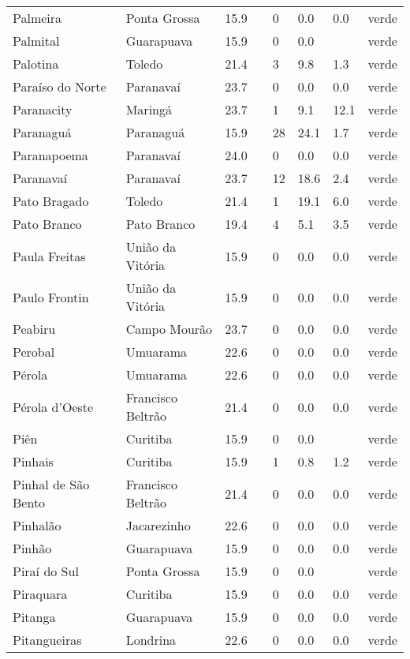 \begin{longtable}{l|lllllll}
  Palmeira & Ponta Grossa & 15.9 &  & 0 & 0.0 & 0.0 & verde \\ 
  Palmital & Guarapuava & 15.9 &  & 0 & 0.0 &  & verde \\ 
  Palotina & Toledo & 21.4 &  & 3 & 9.8 & 1.3 & verde \\ 
  Paraíso do Norte & Paranavaí & 23.7 &  & 0 & 0.0 & 0.0 & verde \\ 
  Paranacity & Maringá & 23.7 &  & 1 & 9.1 & 12.1 & verde \\ 
  Paranaguá & Paranaguá & 15.9 &  & 28 & 24.1 & 1.7 & verde \\ 
  Paranapoema & Paranavaí & 24.0 &  & 0 & 0.0 & 0.0 & verde \\ 
  Paranavaí & Paranavaí & 23.7 &  & 12 & 18.6 & 2.4 & verde \\ 
  Pato Bragado & Toledo & 21.4 &  & 1 & 19.1 & 6.0 & verde \\ 
  Pato Branco & Pato Branco & 19.4 &  & 4 & 5.1 & 3.5 & verde \\ 
  Paula Freitas & União da Vitória & 15.9 &  & 0 & 0.0 & 0.0 & verde \\ 
  Paulo Frontin & União da Vitória & 15.9 &  & 0 & 0.0 & 0.0 & verde \\ 
  Peabiru & Campo Mourão & 23.7 &  & 0 & 0.0 & 0.0 & verde \\ 
  Perobal & Umuarama & 22.6 &  & 0 & 0.0 & 0.0 & verde \\ 
  Pérola & Umuarama & 22.6 &  & 0 & 0.0 & 0.0 & verde \\ 
  Pérola d'Oeste & Francisco Beltrão & 21.4 &  & 0 & 0.0 & 0.0 & verde \\ 
  Piên & Curitiba & 15.9 &  & 0 & 0.0 &  & verde \\ 
  Pinhais & Curitiba & 15.9 &  & 1 & 0.8 & 1.2 & verde \\ 
  Pinhal de São Bento & Francisco Beltrão & 21.4 &  & 0 & 0.0 & 0.0 & verde \\ 
  Pinhalão & Jacarezinho & 22.6 &  & 0 & 0.0 & 0.0 & verde \\ 
  Pinhão & Guarapuava & 15.9 &  & 0 & 0.0 & 0.0 & verde \\ 
  Piraí do Sul & Ponta Grossa & 15.9 &  & 0 & 0.0 &  & verde \\ 
  Piraquara & Curitiba & 15.9 &  & 0 & 0.0 & 0.0 & verde \\ 
  Pitanga & Guarapuava & 15.9 &  & 0 & 0.0 & 0.0 & verde \\ 
  Pitangueiras & Londrina & 22.6 &  & 0 & 0.0 & 0.0 & verde \\ 

\end{longtable}
